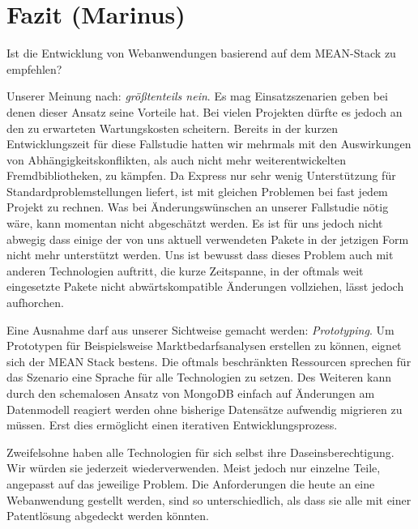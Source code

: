 \chapter{Fazit (Marinus)}
\label{fazit}

Ist die Entwicklung von Webanwendungen basierend auf dem MEAN-Stack zu
empfehlen?

Unserer Meinung nach: \emph{größtenteils nein}. Es mag Einsatzszenarien
geben bei denen dieser Ansatz seine Vorteile hat. Bei vielen Projekten
dürfte es jedoch an den zu erwarteten Wartungskosten scheitern. Bereits
in der kurzen Entwicklungszeit für diese Fallstudie hatten wir mehrmals
mit den Auswirkungen von Abhängigkeitskonflikten, als auch nicht mehr
weiterentwickelten Fremdbibliotheken, zu kämpfen. Da Express nur sehr
wenig Unterstützung für Standardproblemstellungen liefert, ist mit
gleichen Problemen bei fast jedem Projekt zu rechnen. Was bei
Änderungswünschen an unserer Fallstudie nötig wäre, kann momentan nicht
abgeschätzt werden. Es ist für uns jedoch nicht abwegig dass einige der
von uns aktuell verwendeten Pakete in der jetzigen Form nicht mehr
unterstützt werden. Uns ist bewusst dass dieses Problem auch mit anderen
Technologien auftritt, die kurze Zeitspanne, in der oftmals weit
eingesetzte Pakete nicht abwärtskompatible Änderungen vollziehen, lässt
jedoch aufhorchen.

Eine Ausnahme darf aus unserer Sichtweise gemacht werden:
\emph{Prototyping}. Um Prototypen für Beispielsweise
Marktbedarfsanalysen erstellen zu können, eignet sich der MEAN Stack
bestens. Die oftmals beschränkten Ressourcen sprechen für das Szenario
eine Sprache für alle Technologien zu setzen. Des Weiteren kann durch
den schemalosen Ansatz von MongoDB einfach auf Änderungen am Datenmodell
reagiert werden ohne bisherige Datensätze aufwendig migrieren zu müssen.
Erst dies ermöglicht einen iterativen Entwicklungsprozess.

Zweifelsohne haben alle Technologien für sich selbst ihre
Daseinsberechtigung. Wir würden sie jederzeit wiederverwenden. Meist
jedoch nur einzelne Teile, angepasst auf das jeweilige Problem. Die
Anforderungen die heute an eine Webanwendung gestellt werden, sind so
unterschiedlich, als dass sie alle mit einer Patentlösung abgedeckt
werden könnten.
